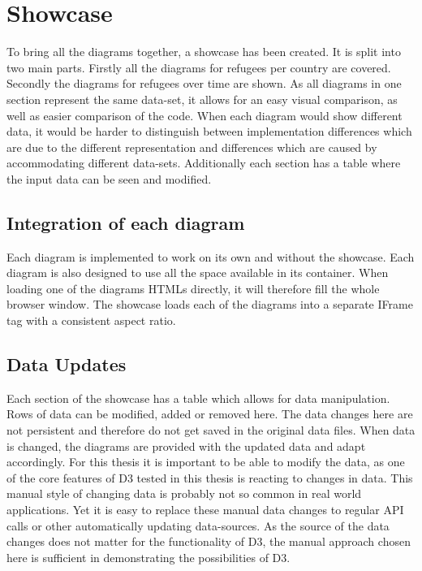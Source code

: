 \section{Showcase}

To bring all the diagrams together, a showcase has been created. It  is split into two main parts. Firstly all the diagrams for refugees per country are covered. Secondly the diagrams for refugees over time are shown. As all diagrams in one section represent the same data-set, it allows for an easy visual comparison, as well as easier comparison of the code. When each diagram would show different data, it would be harder to distinguish between implementation differences which are due to the different representation and differences which are caused by accommodating different data-sets. Additionally each section has a table where the input data can be seen and modified.

\subsection{Integration of each diagram}

Each diagram is implemented to work on its own and without the showcase. Each diagram is also designed to use all the space available in its container. When loading one of the diagrams HTMLs directly, it will therefore fill the whole browser window. The showcase loads each of the diagrams into a separate IFrame tag with a consistent aspect ratio.

\subsection{Data Updates}

Each section of the showcase has a table which allows for data manipulation. Rows of data can be modified, added or removed here. The data changes here are not persistent and therefore do not get saved in the original data files. When data is changed, the diagrams are provided with the updated data and adapt accordingly. For this thesis it is important to be able to modify the data, as one of the core features of D3 tested in this thesis is reacting to changes in data. This manual style of changing data is probably not so common in real world applications. Yet it is easy to replace these manual data changes to regular API calls or other automatically updating data-sources. As the source of the data changes does not matter for the functionality of D3, the manual approach chosen here is sufficient in demonstrating the possibilities of D3.
